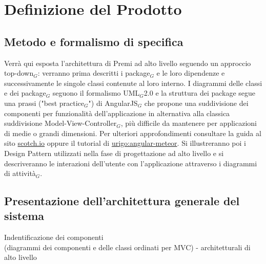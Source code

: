 \newpage
\section{Definizione del Prodotto}

\subsection{Metodo e formalismo di specifica}
Verrà qui esposta l'architettura di Premi ad alto livello seguendo un approccio top-down$_G$: verranno prima descritti i package$_G$ e le loro dipendenze e successivamente le singole classi contenute al loro interno. I diagrammi delle classi e dei package$_G$ seguono il formalismo UML$_G$2.0 e la struttura dei package segue una prassi ("best practice$_G$") di AngularJS$_G$ che propone una suddivisione dei componenti per funzionalità dell'applicazione in alternativa alla classica suddivisione Model-View-Controller$_G$, più difficile da mantenere per applicazioni di medie o grandi dimensioni. Per ulteriori approfondimenti consultare la guida al sito \href{https://scotch.io/tutorials/angularjs-best-practices-directory-structure}{scotch.io} oppure il tutorial di \href{http://angular-meteor.com/tutorial/step_07}{urigo:angular-meteor}.
Si illustreranno poi i Design Pattern utilizzati nella fase di progettazione ad alto livello e si descriveranno le interazioni dell'utente con l'applicazione attraverso i diagrammi di attività$_G$.


\subsection{Presentazione dell'architettura generale del sistema}

Indentificazione dei componenti\\
(diagrammi dei componenti e delle classi ordinati per MVC)
- architetturali di alto livello
